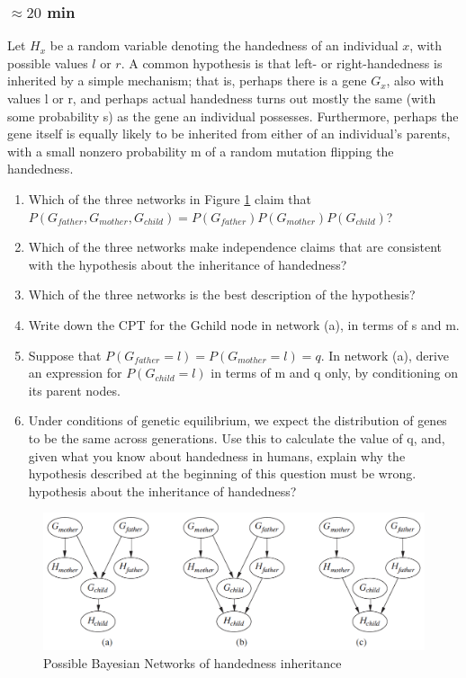 \documentclass[a4paper, 10pt]{article}
\begin{document}
\subsubsection{$\approx 20$ min}
Let $H_x$ be a random variable denoting the handedness of an individual $x$, with possible
values $l$ or $r$. A common hypothesis is that left- or right-handedness is inherited by a simple
mechanism; that is, perhaps there is a gene $G_x$, also with values l or r, and perhaps actual
handedness turns out mostly the same (with some probability s) as the gene an individual
possesses. Furthermore, perhaps the gene itself is equally likely to be inherited from either
of an individual’s parents, with a small nonzero probability m of a random mutation flipping
the handedness.
\begin{enumerate}
    \item Which of the three networks in Figure \ref{fig:b_net} claim that\\ $P(G_{father},G_{mother},G_{child}) =
P(G_{father} )P(G_{mother} )P(G_{child} )$?
    \item Which of the three networks make independence claims that are consistent with the
hypothesis about the inheritance of handedness?
    \item Which of the three networks is the best description of the hypothesis?
    \item Write down the CPT for the Gchild node in network (a), in terms of s and m.
    \item Suppose that $P(G_{father} =l) = P(G_{mother} =l) = q$. In network (a), derive an expression
for $P(G_{child} =l)$ in terms of m and q only, by conditioning on its parent nodes.
    \item Under conditions of genetic equilibrium, we expect the distribution of genes to be the
same across generations. Use this to calculate the value of q, and, given what you know
about handedness in humans, explain why the hypothesis described at the beginning of
this question must be wrong.
hypothesis about the inheritance of handedness?
\end{enumerate}
\begin{figure}[H]
    \centering
    \includegraphics[width=1.\textwidth]{figures/bnet.png}
    \caption{Possible Bayesian Networks of handedness inheritance}
    \label{fig:b_net}
\end{figure}
\end{document}
